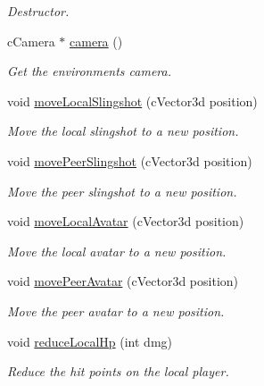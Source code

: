\begin{DoxyCompactItemize}
\begin{DoxyCompactList}\small\item\em Destructor. \item\end{DoxyCompactList}\item 
cCamera $\ast$ \hyperlink{classVirtualEnvironment_afd987f6e88168c734aee6689efb64e5b}{camera} ()
\begin{DoxyCompactList}\small\item\em Get the environments camera. \item\end{DoxyCompactList}\item 
void \hyperlink{classVirtualEnvironment_ab34e50a795e4b872f24b2d604a5464f7}{moveLocalSlingshot} (cVector3d position)
\begin{DoxyCompactList}\small\item\em Move the local slingshot to a new position. \item\end{DoxyCompactList}\item 
void \hyperlink{classVirtualEnvironment_a24bc3eec1917751a16f4ac510f06affc}{movePeerSlingshot} (cVector3d position)
\begin{DoxyCompactList}\small\item\em Move the peer slingshot to a new position. \item\end{DoxyCompactList}\item 
void \hyperlink{classVirtualEnvironment_a73345d04770c2080b1e102fb9457c3d3}{moveLocalAvatar} (cVector3d position)
\begin{DoxyCompactList}\small\item\em Move the local avatar to a new position. \item\end{DoxyCompactList}\item 
void \hyperlink{classVirtualEnvironment_ab0dea50eb3ff01720a539ec669d07e54}{movePeerAvatar} (cVector3d position)
\begin{DoxyCompactList}\small\item\em Move the peer avatar to a new position. \item\end{DoxyCompactList}\item 
void \hyperlink{classVirtualEnvironment_a8cd7268b0e8339cad855715a9a7b6c7f}{reduceLocalHp} (int dmg)
\begin{DoxyCompactList}\small\item\em Reduce the hit points on the local player. \item\end{DoxyCompactList}\item 

\end{DoxyCompactItemize}
